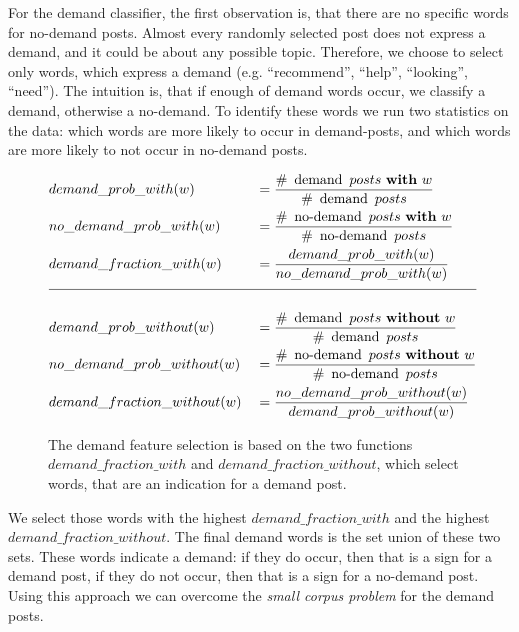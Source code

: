 For the demand classifier, the first observation is, that there are no specific words for no-demand posts.
Almost every randomly selected post does not express a demand, and it could be about any possible topic.
Therefore, we choose to select only words, which express a demand (e.g. ``recommend'', ``help'', ``looking'', ``need'').
The intuition is, that if enough of demand words occur, we classify a demand, otherwise a no-demand.
To identify these words we run two statistics on the data:
which words are more likely to occur in demand-posts, and which words are more likely to not occur in no-demand posts.
\begin{figure}
	\label{eq:demand_feature_selection}
	\begin{alignat*}{3}
		&demand\_prob\_with(w) &&= \dfrac{
		 		\#~\operatorname{demand}~posts~\mathbf{with}~w
			}{
				 \#~\operatorname{demand}~posts
			}
			\\
		&no\_demand\_prob\_with(w) &&= \dfrac{
		 		\#~\operatorname{no-demand}~posts~\mathbf{with}~w
			}{
				 \#~\operatorname{no-demand}~posts
			}
			\\
		&demand\_fraction\_with(w) &&= \frac{
				demand\_prob\_with(w)
			}{
				no\_demand\_prob\_with(w)
			}
			\\[2mm]
			\hline
			\\[0.1mm]
		&demand\_prob\_without(w) &&= \dfrac{
		 		\#~\operatorname{demand}~posts~\mathbf{without}~w
			}{
				 \#~\operatorname{demand}~posts
			}
			\\
		&no\_demand\_prob\_without(w) &&= \dfrac{
		 		\#~\operatorname{no-demand}~posts~\mathbf{without}~w
			}{
				 \#~\operatorname{no-demand}~posts
			}
			\\
		&demand\_fraction\_without(w) &&= \frac{
				no\_demand\_prob\_without(w)
			}{
				demand\_prob\_without(w)
			}
	\end{alignat*}
	\caption{The demand feature selection is based on the two functions $demand\_fraction\_with$ and $demand\_fraction\_without$, which select words, that are an indication for a demand post.}
\end{figure}
We select those words with the highest $demand\_fraction\_with$ and the highest $demand\_fraction\_without$.
The final demand words is the set union of these two sets.
These words indicate a demand: if they do occur, then that is a sign for a demand post, if they do not occur, then that is a sign for a no-demand post.
Using this approach we can overcome the \emph{small corpus problem} for the demand posts.


